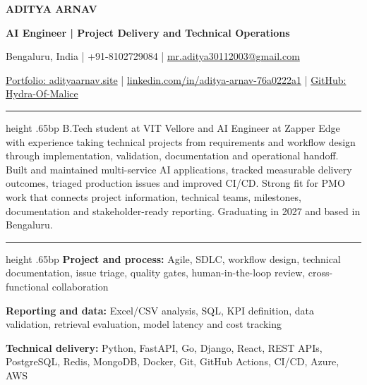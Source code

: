 \documentclass[10pt]{article}
\newcommand{\resumesection}[1]{\par\vspace{8bp}{\fontsize{11bp}{13bp}\selectfont\bfseries #1\par}\vspace{3bp}\hrule height .65bp\vspace{4bp}}
\begin{document}
\fontsize{10.25bp}{12.4bp}\selectfont
{\centering
{\fontsize{19bp}{22bp}\selectfont\bfseries ADITYA ARNAV\par}
\vspace{1bp}
{\fontsize{10.8bp}{13bp}\selectfont\bfseries AI Engineer | Project Delivery and Technical Operations\par}
\vspace{2bp}
{\fontsize{9bp}{11bp}\selectfont Bengaluru, India | +91-8102729084 | \href{mailto:mr.aditya30112003@gmail.com}{mr.aditya30112003@gmail.com}\par}
{\fontsize{9bp}{11bp}\selectfont \href{https://www.adityaarnav.site/}{Portfolio: adityaarnav.site} | \href{https://www.linkedin.com/in/aditya-arnav-76a0222a1}{linkedin.com/in/aditya-arnav-76a0222a1} | \href{https://github.com/Hydra-Of-Malice}{GitHub: Hydra-Of-Malice}\par}}

\resumesection{SUMMARY}
B.Tech student at VIT Vellore and AI Engineer at Zapper Edge with experience taking technical projects from requirements and workflow design through implementation, validation, documentation and operational handoff. Built and maintained multi-service AI applications, tracked measurable delivery outcomes, triaged production issues and improved CI/CD. Strong fit for PMO work that connects project information, technical teams, milestones, documentation and stakeholder-ready reporting. Graduating in 2027 and based in Bengaluru.

\resumesection{PROJECT DELIVERY SKILLS}
\textbf{Project and process:} Agile, SDLC, workflow design, technical documentation, issue triage, quality gates, human-in-the-loop review, cross-functional collaboration\par
\textbf{Reporting and data:} Excel/CSV analysis, SQL, KPI definition, data validation, retrieval evaluation, model latency and cost tracking\par
\textbf{Technical delivery:} Python, FastAPI, Go, Django, React, REST APIs, PostgreSQL, Redis, MongoDB, Docker, Git, GitHub Actions, CI/CD, Azure, AWS
\end{document}
